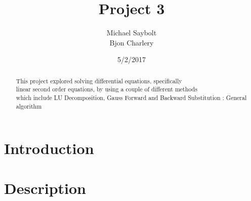 \documentclass[12pt]{article}
\begin{document}
	\title{Project 3}
	\author{Michael Saybolt \\ Bjon Charlery}
	
	\date{5/2/2017}
	\maketitle
	\pagebreak

\begin{abstract}
This project explored solving differential equations, specifically \\linear second order equations, by using a couple of different methods \\ which include LU Decomposition, Gauss Forward and Backward Substitution : General algorithm

\end{abstract}

\bigskip
\bigskip

\section{Introduction}
%

\section{Description}
\end{document}
